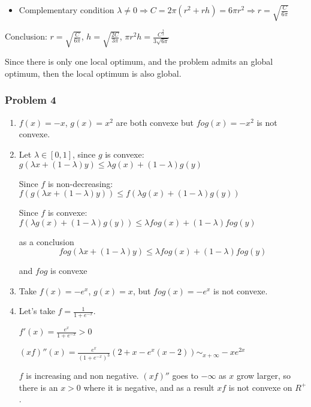 \documentclass[12pt]{article}
\newcommand{\Q}[1]{\subsubsection*{Problem #1}}
\begin{document}
\begin{enumerate}
\begin{itemize}
\item Complementary condition $\lambda \ne 0 \Rightarrow C = 2\pi (r^2 + rh) = 6\pi r^2 \Rightarrow r = \sqrt{\frac{C}{6\pi}}$
\end{itemize}

Conclusion: $r = \sqrt{\frac{C}{6\pi}}$, $h =  \sqrt{\frac{2C}{3\pi}}$, $\pi r^2 h = \frac{C^{\frac32}}{3\sqrt{6\pi}}$

Since there is only one local optimum, and the problem admits an global optimum, then the local optimum is also global.


\end{enumerate}


\Q{4}

\begin{enumerate}
\item $f(x) = -x$, $g(x) = x^2$ are both convexe but $fog(x) = -x^2$ is not convexe.

\item 
Let $\lambda \in [0, 1]$, since $g$ is convexe:
$g(\lambda x + (1-\lambda)y) \le \lambda g(x) + (1-\lambda)g(y)$

Since $f$ is non-decreasing:
$f(g(\lambda x + (1-\lambda)y)) \le f(\lambda g(x) + (1-\lambda)g(y))$

Since $f$ is convexe:
$f(\lambda g(x) + (1-\lambda)g(y)) \le \lambda fog(x) + (1-\lambda)fog(y)$


as a conclusion 
$$fog(\lambda x + (1-\lambda)y) \le \lambda fog(x) + (1-\lambda)fog(y)$$

and $fog$ is convexe

\item

Take $f(x) = -e^x$, $g(x) = x$, but $fog(x) = -e^x$ is not convexe.



\item

Let's take $f = \frac 1 {1 + e^{-x}}$. 

$f'(x) = \frac{e^x}{1+e^{-x}} > 0$

$(xf)''(x) = \frac{e^x}{(1+e^{-x})^3} (2 + x - e^x(x-2)) \sim_{x +\infty} - x e^{2x} $


$f$ is increasing and non negative. 
$(xf)''$ goes to $-\infty$ as $x$ grow larger, so there is an $x > 0$ where it is negative, and as a result $xf$ is not convexe on $R^+$.
 



\end{enumerate}
\end{document}
